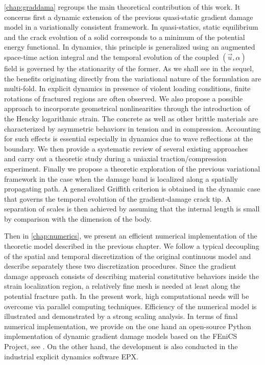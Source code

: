 \cref{chap:graddama} regroups the main theoretical contribution of this work. It concerns first a dynamic extension of the previous quasi-static gradient damage model in a variationally consistent framework. In quasi-statics, static equilibrium and the crack evolution of a solid corresponds to a minimum of the potential energy functional. In dynamics, this principle is generalized using an augmented space-time action integral and the temporal evolution of the coupled $(\vec{u},\alpha)$ field is governed by the stationarity of the former. As we shall see in the sequel, the benefits originating directly from the variational nature of the formulation are multi-fold. In explicit dynamics in presence of violent loading conditions, finite rotations of fractured regions are often observed. We also propose a possible approach to incorporate geometrical nonlinearities through the introduction of the Hencky logarithmic strain. The concrete as well as other brittle materials are characterized by asymmetric behaviors in tension and in compression. Accounting for such effects is essential especially in dynamics due to wave reflections at the boundary. We then provide a systematic review of several existing approaches and carry out a theoretic study during a uniaxial traction/compression experiment. Finally we propose a theoretic exploration of the previous variational framework in the case when the damage band is localized along a spatially propagating path. A generalized Griffith criterion is obtained in the dynamic case that governs the temporal evolution of the gradient-damage crack tip. A separation of scales is then achieved by assuming that the internal length is small by comparison with the dimension of the body.

Then in \cref{chap:numerics}, we present an efficient numerical implementation of the theoretic model described in the previous chapter. We follow a typical decoupling of the spatial and temporal discretization of the original continuous model and describe separately these two discretization procedures. Since the gradient damage approach consists of describing material constitutive behaviors inside the strain localization region, a relatively fine mesh is needed at least along the potential fracture path. In the present work, high computational needs will be overcome via parallel computing techniques. Efficiency of the numerical model is illustrated and demonstrated by a strong scaling analysis. In terms of final numerical implementation, we provide on the one hand an open-source Python implementation of dynamic gradient damage models based on the FEniCS Project, see \cite{LiMaurini:2015}. On the other hand, the development is also conducted in the industrial explicit dynamics software EPX.

